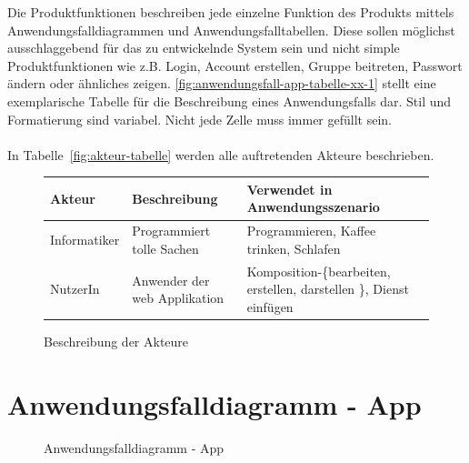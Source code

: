 \begin{tcolorbox}
Die Produktfunktionen beschreiben jede einzelne Funktion des Produkts mittels Anwendungsfalldiagrammen und Anwendungsfalltabellen.
Diese sollen möglichst ausschlaggebend für das zu entwickelnde System sein und nicht simple Produktfunktionen wie z.B. Login, Account erstellen, Gruppe beitreten, Passwort ändern oder ähnliches zeigen.
\autoref{fig:anwendungsfall-app-tabelle-xx-1} stellt eine exemplarische Tabelle für die Beschreibung eines Anwendungsfalls dar. Stil und Formatierung sind variabel. Nicht jede Zelle muss immer gefüllt sein.
\\\\
In  Tabelle~\autoref{fig:akteur-tabelle} werden alle auftretenden Akteure beschrieben.


\end{tcolorbox}

\begin{figure}[h]
	\centering

	\begin{tabularx}{\textwidth}{ p{} | p{} | X }
		\textbf{Akteur} & \textbf{Beschreibung} & \textbf{Verwendet in Anwendungsszenario} \\ \hline
		Informatiker & Programmiert tolle Sachen & Programmieren, Kaffee trinken, Schlafen \\ \hline
		NutzerIn & Anwender der web Applikation & Komposition-\{bearbeiten, erstellen, darstellen \}, Dienst einfügen
	\end{tabularx}

	\caption{Beschreibung der Akteure}
	\label{fig:akteur-tabelle}
\end{figure}



\section{Anwendungsfalldiagramm - App}

\begin{figure}[h]
	\centering
	\caption{Anwendungsfalldiagramm - App}
	\label{fig:anwendungsfalldiagramm-app}
\end{figure}

\newpage

